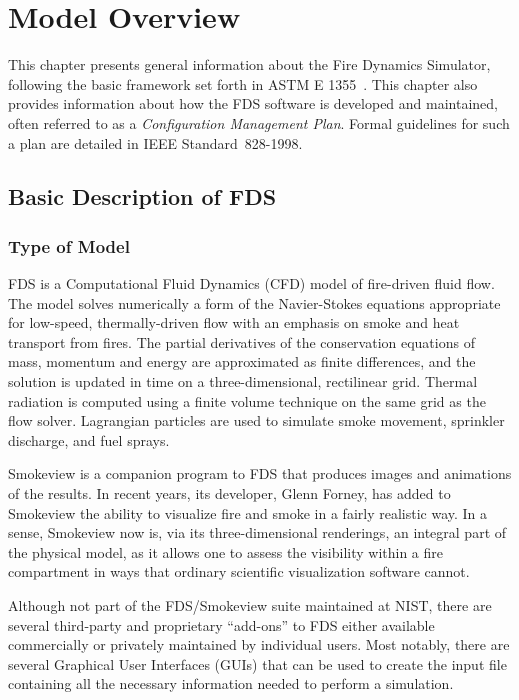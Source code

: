 \documentclass[11pt]{book}
\begin{document}
\chapter{Model Overview}

This chapter presents general information about the Fire Dynamics Simulator, following the basic framework set forth in
ASTM E 1355~\cite{ASTM:E1355}. This chapter also provides information about how the FDS software is developed and maintained, often referred to as a
{\em Configuration Management Plan}. Formal guidelines for such a plan are detailed in IEEE Standard~828-1998.


\section{Basic Description of FDS}


\subsection{Type of Model}

FDS is a Computational Fluid Dynamics (CFD) model of fire-driven fluid flow.
The model solves numerically a form of the Navier-Stokes equations appropriate
for low-speed, thermally-driven flow with an emphasis on smoke and heat transport
from fires. The partial derivatives of the conservation equations of mass, momentum and energy are approximated
as finite differences, and the solution is updated in time on a three-dimensional, rectilinear grid.
Thermal radiation is computed using a finite volume technique on the same grid as the flow solver.
Lagrangian particles are used to simulate smoke movement, sprinkler discharge, and fuel sprays.

Smokeview is a companion program to FDS that produces images and animations of the results. In recent years, its developer, Glenn Forney, has
added to Smokeview the ability to visualize fire and smoke in a fairly realistic way. In a sense, Smokeview now is, via its three-dimensional
renderings, an integral part of the physical model, as it allows one to assess the visibility within a fire compartment in ways that ordinary
scientific visualization software cannot.

Although not part of the FDS/Smokeview suite maintained at NIST, there are several third-party and proprietary ``add-ons'' to FDS either available
commercially or privately maintained by individual users. Most notably, there are several Graphical User Interfaces (GUIs) that can be used
to create the input file containing all the necessary information needed to perform a simulation.
\end{document}

